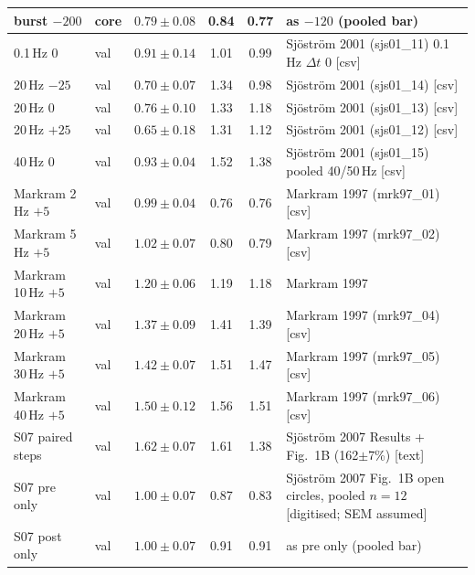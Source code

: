 \documentclass[11pt]{article}
\begin{document}
\begin{table}[p]
\begin{tabular}{l l c c c >{\raggedright\arraybackslash}p{6.3cm}}
burst $-200$ & core & $0.79\pm0.08$ & 0.84 & 0.77 & as $-120$ (pooled bar) \\
\midrule
0.1\,Hz 0 & val & $0.91\pm0.14$ & 1.01 & 0.99 & Sj\"ostr\"om 2001 (sjs01\_11) 0.1\,Hz $\Delta t$ 0 [csv] \\
20\,Hz $-25$ & val & $0.70\pm0.07$ & 1.34 & 0.98 & Sj\"ostr\"om 2001 (sjs01\_14) [csv] \\
20\,Hz 0 & val & $0.76\pm0.10$ & 1.33 & 1.18 & Sj\"ostr\"om 2001 (sjs01\_13) [csv] \\
20\,Hz $+25$ & val & $0.65\pm0.18$ & 1.31 & 1.12 & Sj\"ostr\"om 2001 (sjs01\_12) [csv] \\
40\,Hz 0 & val & $0.93\pm0.04$ & 1.52 & 1.38 & Sj\"ostr\"om 2001 (sjs01\_15) pooled 40/50\,Hz [csv] \\
Markram 2\,Hz $+5$ & val & $0.99\pm0.04$ & 0.76 & 0.76 & Markram 1997 (mrk97\_01) [csv] \\
Markram 5\,Hz $+5$ & val & $1.02\pm0.07$ & 0.80 & 0.79 & Markram 1997 (mrk97\_02) [csv] \\
Markram 10\,Hz $+5$ & val & $1.20\pm0.06$ & 1.19 & 1.18 & Markram 1997 \\
Markram 20\,Hz $+5$ & val & $1.37\pm0.09$ & 1.41 & 1.39 & Markram 1997 (mrk97\_04) [csv] \\
Markram 30\,Hz $+5$ & val & $1.42\pm0.07$ & 1.51 & 1.47 & Markram 1997 (mrk97\_05) [csv] \\
Markram 40\,Hz $+5$ & val & $1.50\pm0.12$ & 1.56 & 1.51 & Markram 1997 (mrk97\_06) [csv] \\
S07 paired steps & val & $1.62\pm0.07$ & 1.61 & 1.38 & Sj\"ostr\"om 2007 Results + Fig.~1B (162$\pm$7\%) [text] \\
S07 pre only & val & $1.00\pm0.07$ & 0.87 & 0.83 & Sj\"ostr\"om 2007 Fig.~1B open circles, pooled $n=12$ [digitised; SEM assumed] \\
S07 post only & val & $1.00\pm0.07$ & 0.91 & 0.91 & as pre only (pooled bar) \\
\bottomrule
\end{tabular}
\end{table}

\end{document}
